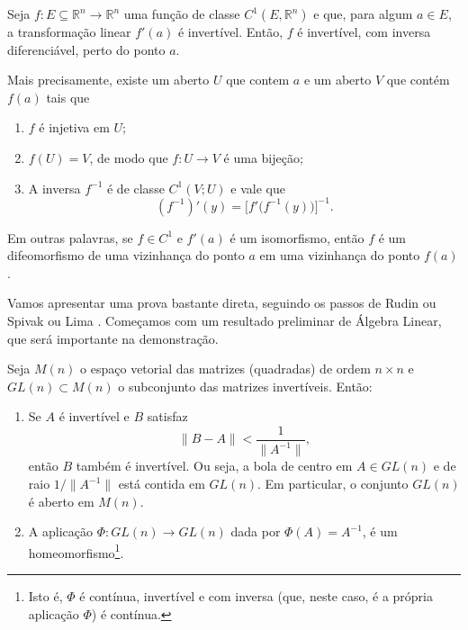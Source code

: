 \begin{teo}
	Seja $f: E \subseteq \mathbb{R}^n \to \mathbb{R}^n$ uma função de classe $C^1(E, \mathbb{R}^n)$ e que, para algum $a \in E$, a transformação linear $f'(a)$ é invertível. Então, $f$ é invertível, com inversa diferenciável, perto do ponto $a$. 
	
	Mais precisamente, existe um aberto $U$ que contem $a$ e um aberto $V$ que contém $f(a)$ tais que
	\begin{enumerate}[$(i)$]
		\item $f$ é injetiva em $U$;
		
		\item $f(U) = V$, de modo que $f: U \to V$ é uma bijeção; 
		
		\item A inversa $f^{-1}$ é de classe $C^{1}(V;U)$ e vale que
		\[
		(f^{-1})'(y) = \big[ f' \big( f^{-1}(y) \big) \big]^{-1}.
		\]
	\end{enumerate}
\end{teo}

\begin{obs}
	Em outras palavras, se $f \in C^1$ e $f'(a)$ é um isomorfismo, então $f$ é um difeomorfismo de uma vizinhança do ponto $a$ em uma vizinhança do ponto $f(a)$. 
\end{obs}

Vamos apresentar uma prova bastante direta, seguindo os passos de Rudin \cite[pp. 193]{Rudi-64} ou Spivak \cite[pp. 41]{Spiv-65} ou Lima \cite[Capítulo 6]{Lima-13}. Começamos com um resultado preliminar de Álgebra Linear, que será importante na demonstração.

\begin{lem}\label{lem:linear1}
	Seja $M(n)$ o espaço vetorial das matrizes (quadradas) de ordem $n \times n$ e $GL(n) \subset M(n)$ o subconjunto das matrizes invertíveis. Então:
	\begin{enumerate}[$(i)$]
		\item Se $A$ é invertível e $B$ satisfaz
		\begin{equation}\label{eqn:gl-open}
		\|B - A\| < \frac{1}{\|A^{-1}\|},
		\end{equation} então $B$ também é invertível. Ou seja, a bola de centro em $A \in GL(n)$ e de raio $1/\|A^{-1}\|$ está contida em $GL(n)$. Em particular, o conjunto $GL(n)$ é aberto em $M(n)$.
		
		\item A aplicação $\Phi: GL(n) \to GL(n)$ dada por $\Phi(A) = A^{-1}$, é um homeomorfismo\footnote{Isto é, $\Phi$ é contínua, invertível e com inversa (que, neste caso, é a própria aplicação $\Phi$) é contínua.}.
	\end{enumerate}
\end{lem}

